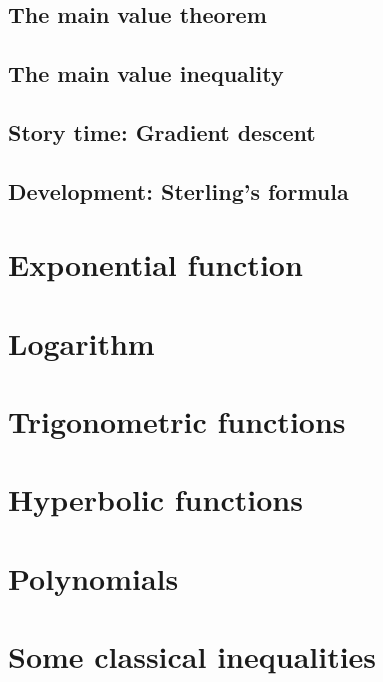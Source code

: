 \documentclass[
	fontsize=10pt, %
	twoside=true, %
	secnumdepth=1, %
	numbers=noenddot, %
]{kaobook}
\begin{document}
\section{The main value theorem}

\section{The main value inequality}

\section{Story time: Gradient descent}

\section{Development: Sterling's formula}


\chapter{Exponential function}

\chapter{Logarithm}

\chapter{Trigonometric functions}

\chapter{Hyperbolic functions}

\chapter{Polynomials}

\chapter{Some classical inequalities}

\appendix %
\end{document}

